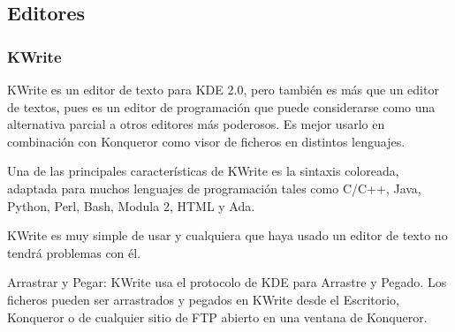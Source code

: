 



\subsection{Editores}


\subsubsection*{KWrite}

{\sf KWrite} es un editor de texto para {\sf KDE 2.0}, pero también es
más que  un editor de  textos, pues es  un editor de  programación que
puede considerarse como  una alternativa parcial a  otros editores más
poderosos. Es  mejor usarlo  en combinación  con {\sf  Konqueror} como
visor de ficheros en distintos lenguajes.

Una de las principales características  de {\sf KWrite} es la sintaxis
coloreada, adaptada  para muchos lenguajes de  programación tales como
C/C++, Java, Python, Perl, Bash, Modula 2, HTML y Ada.

{\sf KWrite}  es muy  simple de  usar y cualquiera  que haya  usado un
editor de texto no tendrá problemas con él.

Arrastrar y  Pegar: {\sf KWrite}  usa el  protocolo de {\sf  KDE} para
Arrastre y  Pegado. Los ficheros  pueden ser arrastrados y  pegados en
{\sf KWrite} desde el Escritorio, {\sf Konqueror} o de cualquier sitio
de FTP abierto en una ventana de {\sf Konqueror}.

